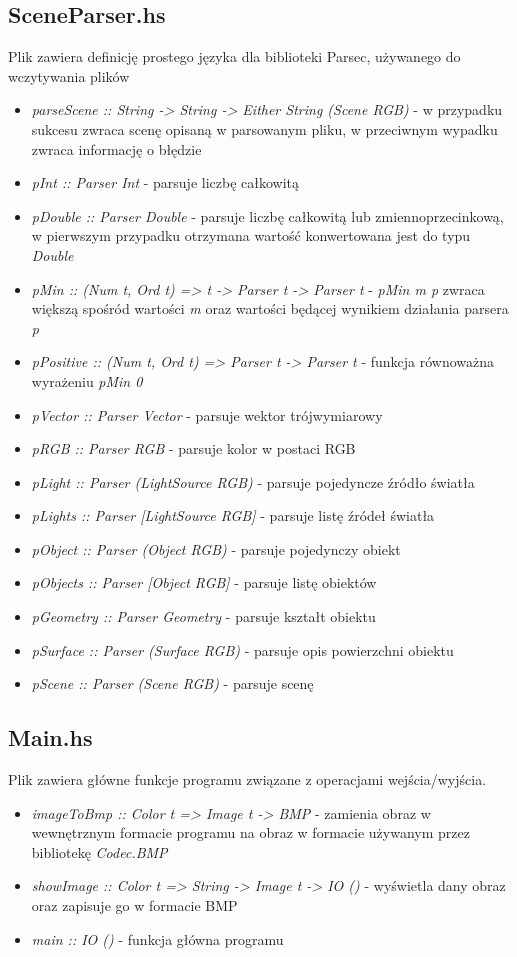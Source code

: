 \documentclass[11pt,a4paper]{article}
\begin{document}
\subsection{SceneParser.hs}
Plik zawiera definicję prostego języka dla biblioteki Parsec, używanego do wczytywania plików
\begin{itemize}
\item\textit{parseScene :: String -> String -> Either String (Scene RGB)} - w przypadku sukcesu zwraca scenę opisaną w parsowanym pliku, w przeciwnym wypadku zwraca informację o błędzie
\item\textit{pInt :: Parser Int} - parsuje liczbę całkowitą
\item\textit{pDouble :: Parser Double} - parsuje liczbę całkowitą lub zmiennoprzecinkową, w pierwszym przypadku otrzymana wartość konwertowana jest do typu \textit{Double}
\item\textit{pMin :: (Num t, Ord t) => t -> Parser t -> Parser t} - \textit{pMin m p} zwraca większą spośród wartości \textit{m} oraz wartości będącej wynikiem działania parsera \textit{p}
\item\textit{pPositive :: (Num t, Ord t) => Parser t -> Parser t} - funkcja równoważna wyrażeniu \textit{pMin 0}
\item\textit{pVector :: Parser Vector} - parsuje wektor trójwymiarowy
\item\textit{pRGB :: Parser RGB} - parsuje kolor w postaci RGB
\item\textit{pLight :: Parser (LightSource RGB)} - parsuje pojedyncze źródło światła
\item\textit{pLights :: Parser [LightSource RGB]} - parsuje listę źródeł światła
\item\textit{pObject :: Parser (Object RGB)} - parsuje pojedynczy obiekt
\item\textit{pObjects :: Parser [Object RGB]} - parsuje listę obiektów
\item\textit{pGeometry :: Parser Geometry} - parsuje kształt obiektu
\item\textit{pSurface :: Parser (Surface RGB)} - parsuje opis powierzchni obiektu
\item\textit{pScene :: Parser (Scene RGB)} - parsuje scenę
\end{itemize}
\subsection{Main.hs}
Plik zawiera główne funkcje programu związane z operacjami wejścia/wyjścia.
\begin{itemize}
\item\textit{imageToBmp :: Color t => Image t -> BMP} - zamienia obraz w wewnętrznym formacie programu na obraz w formacie używanym przez bibliotekę \textit{Codec.BMP}
\item\textit{showImage :: Color t => String -> Image t -> IO ()} - wyświetla dany obraz oraz zapisuje go w formacie BMP
\item\textit{main :: IO ()} - funkcja główna programu
\end{itemize}
\end{document}
